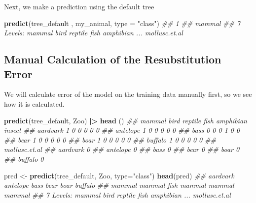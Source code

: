 \documentclass[
  notitlepage]{book}
\newenvironment{Shaded}{\begin{snugshade}}{\end{snugshade}}
\newcommand{\CommentTok}[1]{\textcolor[rgb]{0.56,0.35,0.01}{\textit{#1}}}
\newcommand{\DataTypeTok}[1]{\textcolor[rgb]{0.13,0.29,0.53}{#1}}
\newcommand{\ErrorTok}[1]{\textcolor[rgb]{0.64,0.00,0.00}{\textbf{#1}}}
\newcommand{\KeywordTok}[1]{\textcolor[rgb]{0.13,0.29,0.53}{\textbf{#1}}}
\newcommand{\NormalTok}[1]{#1}
\newcommand{\OperatorTok}[1]{\textcolor[rgb]{0.81,0.36,0.00}{\textbf{#1}}}
\newcommand{\StringTok}[1]{\textcolor[rgb]{0.31,0.60,0.02}{#1}}
\begin{document}
Next, we make a prediction using the default tree

\begin{Shaded}
\begin{Highlighting}[]
\KeywordTok{predict}\NormalTok{(tree\_default , my\_animal, }\DataTypeTok{type =} \StringTok{"class"}\NormalTok{)}
\CommentTok{\#\#      1 }
\CommentTok{\#\# mammal }
\CommentTok{\#\# 7 Levels: mammal bird reptile fish amphibian ... mollusc.et.al}
\end{Highlighting}
\end{Shaded}

\hypertarget{manual-calculation-of-the-resubstitution-error}{%
\subsection{Manual Calculation of the Resubstitution Error}\label{manual-calculation-of-the-resubstitution-error}}

We will calculate error of the model on the training data manually first,
so we see how it is calculated.

\begin{Shaded}
\begin{Highlighting}[]
\KeywordTok{predict}\NormalTok{(tree\_default, Zoo) }\OperatorTok{|}\ErrorTok{\textgreater{}}\StringTok{ }\KeywordTok{head}\NormalTok{ ()}
\CommentTok{\#\#          mammal bird reptile fish amphibian insect}
\CommentTok{\#\# aardvark      1    0       0    0         0      0}
\CommentTok{\#\# antelope      1    0       0    0         0      0}
\CommentTok{\#\# bass          0    0       0    1         0      0}
\CommentTok{\#\# bear          1    0       0    0         0      0}
\CommentTok{\#\# boar          1    0       0    0         0      0}
\CommentTok{\#\# buffalo       1    0       0    0         0      0}
\CommentTok{\#\#          mollusc.et.al}
\CommentTok{\#\# aardvark             0}
\CommentTok{\#\# antelope             0}
\CommentTok{\#\# bass                 0}
\CommentTok{\#\# bear                 0}
\CommentTok{\#\# boar                 0}
\CommentTok{\#\# buffalo              0}
\end{Highlighting}
\end{Shaded}

\begin{Shaded}
\begin{Highlighting}[]
\NormalTok{pred \textless{}{-}}\StringTok{ }\KeywordTok{predict}\NormalTok{(tree\_default, Zoo, }\DataTypeTok{type=}\StringTok{"class"}\NormalTok{)}
\KeywordTok{head}\NormalTok{(pred)}
\CommentTok{\#\# aardvark antelope     bass     bear     boar  buffalo }
\CommentTok{\#\#   mammal   mammal     fish   mammal   mammal   mammal }
\CommentTok{\#\# 7 Levels: mammal bird reptile fish amphibian ... mollusc.et.al}
\end{Highlighting}
\end{Shaded}
\end{document}
